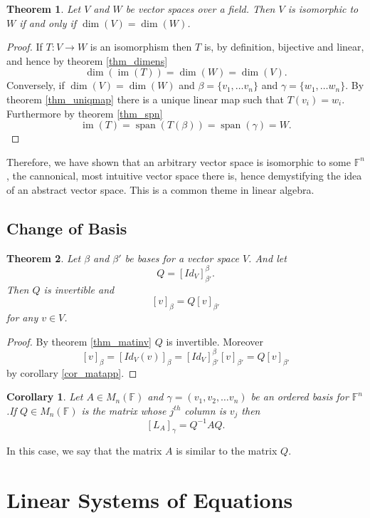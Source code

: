 \documentclass[oneside, 12pt]{book}
\DeclareMathOperator{\spn}{span}
\DeclareMathOperator{\im}{im}
\newtheorem{thm}{Theorem}[section]
\newtheorem{cor}{Corollary}[section]
\theoremstyle{definition}
\begin{document}
\begin{thm}
  \label{thm_iso}
  Let $V$ and $W$ be vector spaces over a field. Then $V$ is isomorphic to $W$ if and only if $\dim(V)=\dim(W)$.
\end{thm}
\begin{proof}
  If $T:V \to W$ is an isomorphism then $T$ is, by definition, bijective and linear, and hence by theorem \ref{thm_dimens}
  \[\dim(\im(T))=\dim(W)=\dim(V).\] Conversely, if $\dim(V)=\dim(W)$ and $\beta=\{v_{1}, \dots v_{n}\}$ and $\gamma =\{w_{1}, \dots w_{n}\}$. By theorem \ref{thm_uniqmap} there is a unique linear map such that $T(v_{i})=w_{i}$. Furthermore by theorem \ref{thm_spn} \[\im(T)=\spn(T(\beta))=\spn(\gamma)=W.\]
\end{proof}
Therefore, we have shown that an arbitrary vector space is isomorphic to some $\mathbb{F}^{n}$, the cannonical, most intuitive vector space there is, hence demystifying the idea of an abstract vector space. This is a common theme in linear algebra.


\section{Change of Basis}
\begin{thm}
  \label{thm_chbase}
  Let $\beta$ and $\beta'$ be bases for a vector space $V$. And let \[Q=[Id_{V}]_{\beta'}^{\beta}.\]
  Then $Q$ is invertible and \[[v]_{\beta}=Q[v]_{\beta'}\] for any $v \in V$.
\end{thm}
\begin{proof}
  By theorem \ref{thm_matinv} $Q$ is invertible. Moreover \[[v]_{\beta}=[Id_{V}(v)]_{\beta}=[Id_{V}]_{\beta'}^{\beta}[v]_{\beta'}=Q[v]_{\beta'}\] by corollary \ref{cor_matapp}.
\end{proof}
\begin{cor}
  \label{cor_chbas}
Let $A \in M_{n}(\mathbb{F})$ and $\gamma=(v_{1}, v_{2}, \dots v_{n})$ be an ordered basis for $\mathbb{F}^{n}$.If $Q \in M_{n}(\mathbb{F})$ is the matrix whose $j^{th}$ column is $v_{j}$ then \[[L_{A}]_{\gamma}=Q^{-1}AQ.\]
\end{cor}
In this case, we say that the matrix $A$ is similar to the matrix $Q$.
\chapter{Linear Systems of Equations}
\end{document}
